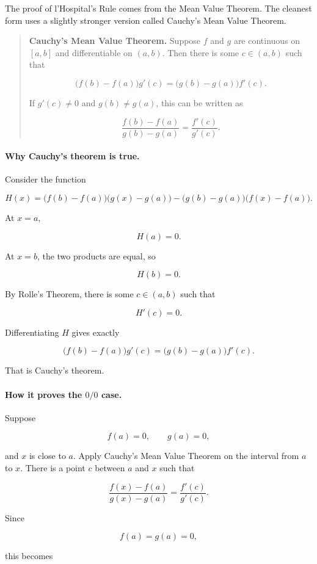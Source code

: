 The proof of l'Hospital's Rule comes from the Mean Value Theorem.  The cleanest
form uses a slightly stronger version called Cauchy's Mean Value Theorem.

\begin{quote}
\textbf{Cauchy's Mean Value Theorem.}
Suppose \(f\) and \(g\) are continuous on \([a,b]\) and differentiable on \((a,b)\).
Then there is some \(c\in(a,b)\) such that

\[
\bigl(f(b)-f(a)\bigr)g'(c)
=
\bigl(g(b)-g(a)\bigr)f'(c).
\]

If \(g'(c)\neq0\) and \(g(b)\neq g(a)\), this can be written as

\[
\frac{f(b)-f(a)}{g(b)-g(a)}
=
\frac{f'(c)}{g'(c)}.
\]
\end{quote}

\paragraph{Why Cauchy's theorem is true.}
Consider the function

\[
H(x)=\bigl(f(b)-f(a)\bigr)\bigl(g(x)-g(a)\bigr)
-
\bigl(g(b)-g(a)\bigr)\bigl(f(x)-f(a)\bigr).
\]

At \(x=a\),

\[
H(a)=0.
\]

At \(x=b\), the two products are equal, so

\[
H(b)=0.
\]

By Rolle's Theorem, there is some \(c\in(a,b)\) such that

\[
H'(c)=0.
\]

Differentiating \(H\) gives exactly

\[
\bigl(f(b)-f(a)\bigr)g'(c)
=
\bigl(g(b)-g(a)\bigr)f'(c).
\]

That is Cauchy's theorem.

\paragraph{How it proves the \(0/0\) case.}
Suppose

\[
f(a)=0,
\qquad
g(a)=0,
\]

and \(x\) is close to \(a\).  Apply Cauchy's Mean Value Theorem on the interval
from \(a\) to \(x\).  There is a point \(c\) between \(a\) and \(x\) such that

\[
\frac{f(x)-f(a)}{g(x)-g(a)}
=
\frac{f'(c)}{g'(c)}.
\]

Since

\[
f(a)=g(a)=0,
\]

this becomes

